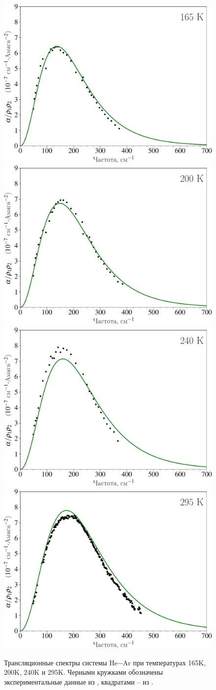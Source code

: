 \begin{figure}[H]
    \centering
    \includegraphics[width=0.49\linewidth]{./pictures/two_atom_spectra/alpha_165K-crop.pdf} 
    \includegraphics[width=0.49\linewidth]{./pictures/two_atom_spectra/alpha_200K-crop.pdf} \\
    \includegraphics[width=0.49\linewidth]{./pictures/two_atom_spectra/alpha_240K-crop.pdf}
    \includegraphics[width=0.49\linewidth]{./pictures/two_atom_spectra/alpha_295K-crop.pdf}
    \caption{Трансляционные спектры системы He$-$Ar при температурах 165K, 200K, 240K и 295K. Черными кружками обозначены экспериментальные данные из \cite{bukhtoyarova1977, bukhtoyarova1977_2, ryzhov1974}, квадратами -- из \cite{bosomworth1965_part2}.}
    \label{fig:two-atom-spectra}
\end{figure}


